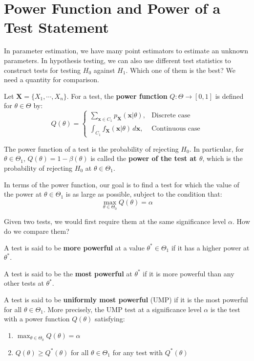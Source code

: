 \documentclass{huhtakm-template-book-v2}
\begin{document}
\section{Power Function and Power of a Test Statement}
In parameter estimation, we have many point estimators to estimate an unknown parameters. In hypothesis testing, we can also use different test statistics to construct tests for testing $H_{0}$ against $H_{1}$. Which one of them is the best? We need a quantity for comparison.
\begin{defn}
	Let $\mathbf{X}=\{X_{1},\cdots,X_{n}\}$. For a test, the \textbf{power function} $Q:\Theta\to[0,1]$ is defined for $\theta\in\Theta$ by:
	\begin{equation*}
		Q(\theta)=\begin{cases}
			\sum_{\mathbf{x}\in C_{1}}p_{\mathbf{X}}(\mathbf{x}|\theta), &\text{Discrete case}\\
			\int_{C_{1}}f_{\mathbf{X}}(\mathbf{x}|\theta)\,d\mathbf{x}, &\text{Continuous case}
		\end{cases}
	\end{equation*}
\end{defn}
\begin{rem}
	The power function of a test is the probability of rejecting $H_{0}$. In particular, for $\theta\in\Theta_{1}$, $Q(\theta)=1-\beta(\theta)$ is called the \textbf{power of the test at $\theta$}, which is the probability of rejecting $H_{0}$ at $\theta\in\Theta_{1}$.
\end{rem}
\begin{rem}
	In terms of the power function, our goal is to find a test for which the value of the power at $\theta\in\Theta_{1}$ is as large as possible, subject to the condition that:
	\begin{equation*}
		\max_{\theta\in\Theta_{0}}Q(\theta)=\alpha
	\end{equation*}
\end{rem}
Given two tests, we would first require them at the same significance level $\alpha$. How do we compare them?
\begin{defn}
	A test is said to be \textbf{more powerful} at a value $\theta^{*}\in\Theta_{1}$ if it has a higher power at $\theta^{*}$.
	
	A test is said to be the \textbf{most powerful} at $\theta^{*}$ if it is more powerful than any other tests at $\theta^{*}$.
	
	A test is said to be \textbf{uniformly most powerful} (UMP) if it is the most powerful for all $\theta\in\Theta_{1}$. More precisely, the UMP test at a significance level $\alpha$ is the test with a power function $Q(\theta)$ satisfying:
	\begin{enumerate}
		\item $\max_{\theta\in\Theta_{0}}Q(\theta)=\alpha$
		\item $Q(\theta)\geq Q^{*}(\theta)$ for all $\theta\in\Theta_{1}$ for any test with $Q^{*}(\theta)$
	\end{enumerate}
\end{defn}
\end{document}
